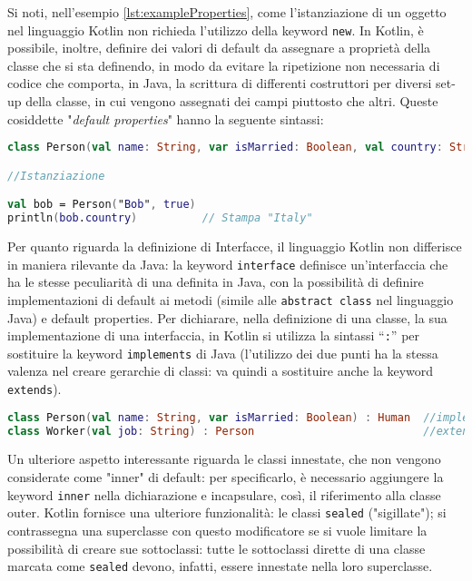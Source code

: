 Si noti, nell'esempio \ref{lst:exampleProperties}, come l'istanziazione di un oggetto nel linguaggio Kotlin non richieda l'utilizzo della keyword \texttt{new}. In Kotlin, è possibile, inoltre, definire dei valori di default da assegnare a proprietà della classe che si sta definendo, in modo da evitare la ripetizione non necessaria di codice che comporta, in Java, la scrittura di differenti costruttori per diversi set-up della classe, in cui vengono assegnati dei campi piuttosto che altri. Queste cosiddette "{\em default properties}" hanno la seguente sintassi:\\

\begin{lstlisting}[caption={Proprietà predefinite}, captionpos=b, label={lst:exampleDefProperties}, language=Kotlin]
class Person(val name: String, var isMarried: Boolean, val country: String = "Italy")

//Istanziazione

val bob = Person("Bob", true)
println(bob.country)          // Stampa "Italy"
\end{lstlisting}

Per quanto riguarda la definizione di Interfacce, il linguaggio Kotlin non differisce in maniera rilevante da Java: la keyword \texttt{interface} definisce un’interfaccia che ha le stesse peculiarità di una definita in Java, con la possibilità di definire implementazioni di default ai metodi (simile alle \texttt{abstract class} nel linguaggio Java) e default properties. Per dichiarare, nella definizione di una classe, la sua implementazione di una interfaccia, in Kotlin si utilizza la sintassi “\texttt{:}” per sostituire la keyword \texttt{implements} di Java (l'utilizzo dei due punti ha la stessa valenza nel creare gerarchie di classi: va quindi a sostituire anche la keyword \texttt{extends}).\\

\begin{lstlisting}[caption={Utilizzo della notazione "\texttt{:}"}, captionpos=b, label={lst:exampleEreditarietà}, language=Kotlin]
class Person(val name: String, var isMarried: Boolean) : Human  //implements
class Worker(val job: String) : Person                          //extends
\end{lstlisting}

Un ulteriore aspetto interessante riguarda le classi innestate, che non vengono considerate come "inner" di default: per specificarlo, è necessario aggiungere la keyword \texttt{inner} nella dichiarazione e incapsulare, così, il riferimento alla classe outer. Kotlin fornisce una ulteriore funzionalità: le classi \texttt{sealed} ("sigillate"); si contrassegna una superclasse con questo modificatore se si vuole limitare la possibilità di creare sue sottoclassi: tutte le sottoclassi dirette di una classe marcata come \texttt{sealed} devono, infatti, essere innestate nella loro superclasse.\\

